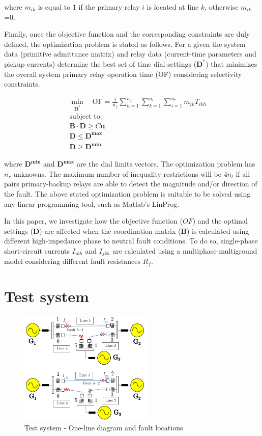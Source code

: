 \documentclass[letterpaper, 10 pt, conference]{IEEEtran}
\begin{document}
where $m_{ik}$ is equal to 1 if the primary relay $i$ is located at line $k$, otherwise  $m_{ik}$=0.


Finally, once the objective function and the corresponding constraints are duly defined, the optimization problem is stated as follows.
For a given the system data (primitive admittance matrix) and relay data (current-time parameters and pickup currents) determine the best set of time dial settings ($\mathbf{D^*}$) that minimizes the overall system primary relay operation time (OF) considering selectivity constraints.

\begin{eqnarray}\label{odocr1}
& &  \min_{\mathbf{D^*}} \quad \mbox{OF}=\frac{1}{n_f}\sum_{h=1}^{n_f}\sum_{k=1}^{n_l}\sum_{i=1}^{n_r}m_{ik}  T_{ikh}  \\ \nonumber
& & \mbox{subject to}:\\\label{odocr2}
& &\mathbf{B}\cdot\mathbf{D}\ge C\mathbf{u}\\\label{odocr3}
& &\mathbf{D}\le\mathbf{D^{max}}\\\label{odocr4}
& &\mathbf{D}\ge\mathbf{D^{min}}
\end{eqnarray}

where  $\mathbf{D^{min}}$ and $\mathbf{D^{max}}$ are the dial limits vectors.
The optimization problem has $n_r$ unknowns. The maximum number of inequality restrictions will be 4$n_l$ if all pairs primary-backup relays are able to detect the magnitude and/or direction of the fault.
The above stated optimization problem is suitable to be solved using any linear programming tool, such as Matlab's LinProg.


In this paper, we investigate how the objective function ($OF$) and the optimal settings ($\mathbf{D}$) are affected when the coordination matrix ($\mathbf{B}$) is calculated using different high-impedance phase to neutral fault conditions. To do so, single-phase short-circuit currents $I_{ikh}$ and $I_{jkh}$ are calculated using a multiphase-multiground model considering different fault resistances $R_f$.

 \section{Test system}  \label{casestudy}

\begin{figure}[t!] \centerline{
     \includegraphics[width=6.4cm]{images/figure1.pdf}}
       \caption{Test system - One-line diagram and fault locations\cite{urdaneta1988}}
      \label{figure1}
        \end{figure}
\end{document}
